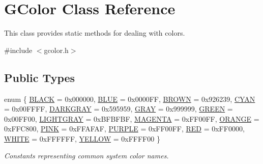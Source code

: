 \hypertarget{classsgl_1_1GColor}{}\section{G\+Color Class Reference}
\label{classsgl_1_1GColor}


This class provides static methods for dealing with colors.  




{\ttfamily \#include $<$gcolor.\+h$>$}

\subsection*{Public Types}
\begin{DoxyCompactItemize}
\item 
enum \{ \mbox{\hyperlink{classsgl_1_1GColor_a06fc87d81c62e9abb8790b6e5713c55baf77fb67151d0c18d397069ad8c271ba3}{B\+L\+A\+CK}} = 0x000000, 
\mbox{\hyperlink{classsgl_1_1GColor_a06fc87d81c62e9abb8790b6e5713c55ba35d6719cb4d7577c031b3d79057a1b79}{B\+L\+UE}} = 0x0000\+FF, 
\mbox{\hyperlink{classsgl_1_1GColor_a06fc87d81c62e9abb8790b6e5713c55ba1fa14482e7e4dc1332ab8c9d995fe570}{B\+R\+O\+WN}} = 0x926239, 
\mbox{\hyperlink{classsgl_1_1GColor_a06fc87d81c62e9abb8790b6e5713c55baafe71cad474c15ce63b300c470eef8cc}{C\+Y\+AN}} = 0x00\+F\+F\+FF, 
\mbox{\hyperlink{classsgl_1_1GColor_a06fc87d81c62e9abb8790b6e5713c55ba52a9af0edd45f66d37996edcb1ca69f0}{D\+A\+R\+K\+G\+R\+AY}} = 0x595959, 
\mbox{\hyperlink{classsgl_1_1GColor_a06fc87d81c62e9abb8790b6e5713c55ba3fb6c4ad00f4ad98553e01229d1803ac}{G\+R\+AY}} = 0x999999, 
\mbox{\hyperlink{classsgl_1_1GColor_a06fc87d81c62e9abb8790b6e5713c55baa60bd322f93178d68184e30e162571ca}{G\+R\+E\+EN}} = 0x00\+F\+F00, 
\mbox{\hyperlink{classsgl_1_1GColor_a06fc87d81c62e9abb8790b6e5713c55ba3dcbd50f6d434719ddfb9da673977307}{L\+I\+G\+H\+T\+G\+R\+AY}} = 0x\+B\+F\+B\+F\+BF, 
\mbox{\hyperlink{classsgl_1_1GColor_a06fc87d81c62e9abb8790b6e5713c55ba56926c820ad72d0977e7ee44d9916e62}{M\+A\+G\+E\+N\+TA}} = 0x\+F\+F00\+FF, 
\mbox{\hyperlink{classsgl_1_1GColor_a06fc87d81c62e9abb8790b6e5713c55bace9ee4c1a6b777940c7f3a766a9a88d4}{O\+R\+A\+N\+GE}} = 0x\+F\+F\+C800, 
\mbox{\hyperlink{classsgl_1_1GColor_a06fc87d81c62e9abb8790b6e5713c55ba186598537092d140eaa60720ec7e0821}{P\+I\+NK}} = 0x\+F\+F\+A\+F\+AF, 
\mbox{\hyperlink{classsgl_1_1GColor_a06fc87d81c62e9abb8790b6e5713c55ba2772ad7cd64f03c2aed60f91c69fa69d}{P\+U\+R\+P\+LE}} = 0x\+F\+F00\+FF, 
\mbox{\hyperlink{classsgl_1_1GColor_a06fc87d81c62e9abb8790b6e5713c55baf80f9a890089d211842d59625e561f88}{R\+ED}} = 0x\+F\+F0000, 
\mbox{\hyperlink{classsgl_1_1GColor_a06fc87d81c62e9abb8790b6e5713c55ba283fc479650da98250635b9c3c0e7e50}{W\+H\+I\+TE}} = 0x\+F\+F\+F\+F\+FF, 
\mbox{\hyperlink{classsgl_1_1GColor_a06fc87d81c62e9abb8790b6e5713c55bae735a848bf82163a19236ead1c3ef2d2}{Y\+E\+L\+L\+OW}} = 0x\+F\+F\+F\+F00
 \}
\begin{DoxyCompactList}\small\item\em Constants representing common system color names. \end{DoxyCompactList}\end{DoxyCompactItemize}
